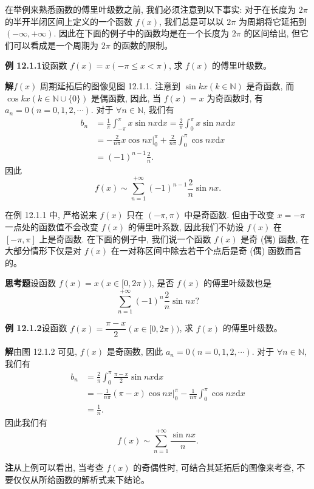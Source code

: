 \documentclass[UTF8,12pt,a4paper,fontset=fandol]{ctexart}
\begin{document}
在举例来熟悉函数的傅里叶级数之前, 我们必须注意到以下事实: 对于在长度为 $2\pi$ 的半开半闭区间上定义的一个函数 $f(x)$, 我们总是可以以 $2\pi$ 为周期将它延拓到 $(-\infty,+\infty)$. 因此在下面的例子中的函数均是在一个长度为 $2\pi$ 的区间给出, 但它们可以看成是一个周期为 $2\pi$ 的函数的限制。

\noindent\textbf{例 12.1.1}\quad 设函数 $f(x)=x(-\pi\leqslant x<\pi)$, 求 $f(x)$ 的傅里叶级数。

\noindent\textbf{解}\quad $f(x)$ 周期延拓后的图像见图 12.1.1. 注意到 $\sin kx(k\in\mathbb N)$ 是奇函数, 而 $\cos kx(k\in\mathbb N\cup\{0\})$ 是偶函数, 因此, 当 $f(x)=x$ 为奇函数时, 有 $a_n=0(n=0,1,2,\cdots)$. 对于 $\forall n\in\mathbb N$, 我们有
\[
\begin{aligned}
  b_n
  &=\frac1\pi\int_{-\pi}^{\pi}x\sin nx\mathrm dx
  =\frac2\pi\int_0^\pi x\sin nx\mathrm dx\\
  &=-\frac2{n\pi}x\cos nx\bigg|_0^\pi+\frac2{n\pi}\int_0^\pi\cos nx\mathrm dx\\
  &=(-1)^{n-1}\frac2n.
\end{aligned}
\]
因此
\[
  f(x)\sim\sum_{n=1}^{+\infty}(-1)^{n-1}\frac2n\sin nx.
\]

在例 12.1.1 中, 严格说来 $f(x)$ 只在 $(-\pi,\pi)$ 中是奇函数. 但由于改变 $x=-\pi$ 一点处的函数值不会改变 $f(x)$ 的傅里叶系数, 因此我们不妨设 $f(x)$ 在 $[-\pi,\pi]$ 上是奇函数. 在下面的例子中, 我们说一个函数 $f(x)$ 是奇 (偶) 函数, 在大部分情形下仅是对 $f(x)$ 在一对称区间中除去若干个点后是奇 (偶) 函数而言的。

\noindent\textbf{思考题}\quad 设函数 $f(x)=x(x\in[0,2\pi))$, 是否 $f(x)$ 的傅里叶级数也是
\[
  \sum_{n=1}^{+\infty}(-1)^n\frac2n\sin nx?
\]

\noindent\textbf{例 12.1.2}\quad 设函数 $f(x)=\dfrac{\pi-x}{2}(x\in[0,2\pi))$, 求 $f(x)$ 的傅里叶级数。

\noindent\textbf{解}\quad 由图 12.1.2 可见, $f(x)$ 是奇函数, 因此 $a_n=0(n=0,1,2,\cdots)$. 对于 $\forall n\in\mathbb N$, 我们有
\[
\begin{aligned}
  b_n
  &=\frac2\pi\int_0^\pi\frac{\pi-x}{2}\sin nx\mathrm dx\\
  &=-\frac1{n\pi}(\pi-x)\cos nx\bigg|_0^\pi
    -\frac1{n\pi}\int_0^\pi\cos nx\mathrm dx\\
  &=\frac1n.
\end{aligned}
\]
因此我们有
\[
  f(x)\sim\sum_{n=1}^{+\infty}\frac{\sin nx}{n}.
\]

\noindent\textbf{注}\quad 从上例可以看出, 当考查 $f(x)$ 的奇偶性时, 可结合其延拓后的图像来考查, 不要仅仅从所给函数的解析式来下结论。
\end{document}
